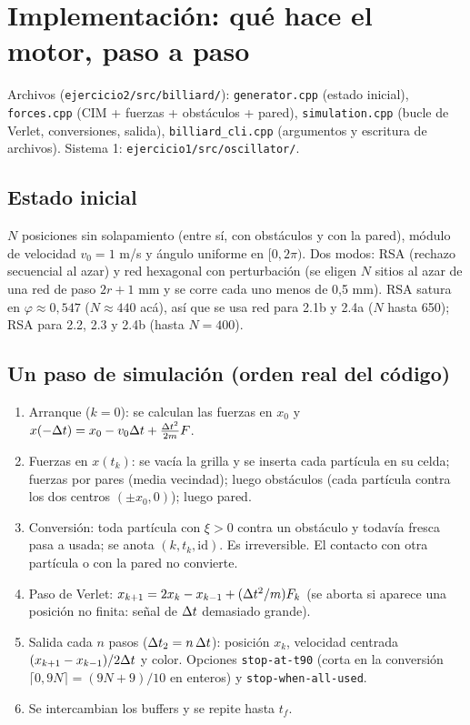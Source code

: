\documentclass[10.5pt,a4paper]{article}
\begin{document}
\section{Implementación: qué hace el motor, paso a paso}
Archivos (\texttt{ejercicio2/src/billiard/}): \texttt{generator.cpp} (estado inicial), \texttt{forces.cpp} (CIM + fuerzas + obstáculos + pared), \texttt{simulation.cpp} (bucle de Verlet, conversiones, salida), \texttt{billiard\_cli.cpp} (argumentos y escritura de archivos). Sistema 1: \texttt{ejercicio1/src/oscillator/}.

\subsection{Estado inicial}
$N$ posiciones sin solapamiento (entre sí, con obstáculos y con la pared), módulo de velocidad $v_0=1$ m/s y ángulo uniforme en $[0,2\pi)$. Dos modos: RSA (rechazo secuencial al azar) y red hexagonal con perturbación (se eligen $N$ sitios al azar de una red de paso $2r+1$ mm y se corre cada uno menos de 0,5 mm). RSA satura en $\varphi\approx0{,}547$ ($N\approx440$ acá), así que se usa red para 2.1b y 2.4a ($N$ hasta 650); RSA para 2.2, 2.3 y 2.4b (hasta $N=400$).

\subsection{Un paso de simulación (orden real del código)}
\begin{enumerate}
\item Arranque ($k=0$): se calculan las fuerzas en $x_0$ y $x(-\Delta t)=x_0-v_0\Delta t+\frac{\Delta t^2}{2m}F$.
\item Fuerzas en $x(t_k)$: se vacía la grilla y se inserta cada partícula en su celda; fuerzas por pares (media vecindad); luego obstáculos (cada partícula contra los dos centros $(\pm x_0,0)$); luego pared.
\item Conversión: toda partícula con $\xi>0$ contra un obstáculo y todavía fresca pasa a usada; se anota $(k,t_k,\text{id})$. Es irreversible. El contacto con otra partícula o con la pared no convierte.
\item Paso de Verlet: $x_{k+1}=2x_k-x_{k-1}+(\Delta t^2/m)F_k$ (se aborta si aparece una posición no finita: señal de $\Delta t$ demasiado grande).
\item Salida cada $n$ pasos ($\Delta t_2=n\,\Delta t$): posición $x_k$, velocidad centrada $(x_{k+1}-x_{k-1})/2\Delta t$ y color. Opciones \texttt{stop-at-t90} (corta en la conversión $\lceil0{,}9N\rceil=(9N+9)/10$ en enteros) y \texttt{stop-when-all-used}.
\item Se intercambian los buffers y se repite hasta $t_f$.
\end{enumerate}
\end{document}
